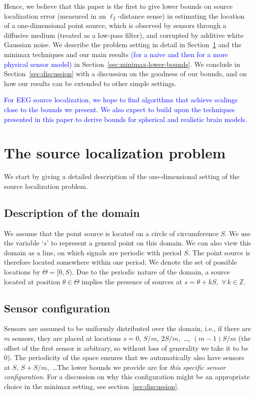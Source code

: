 \documentclass[conference]{IEEEtran}
\begin{document}
Hence, we believe that this paper is the first to give lower bounds on source
localization error (measured in an $\ell_2$-distance sense) in estimating the
location of a one-dimensional point source, which is observed by sensors
through a diffusive medium (treated as a low-pass filter), and corrupted by
additive white Gaussian noise. We describe the problem setting in detail in
Section~\ref{sec:source-localization} and the minimax techniques and our main
results \textcolor{blue}{(for a naive and then for a more physical sensor
model)} in Section~\ref{sec:minimax-lower-bounds}. We conclude in
Section~\ref{sec:discussion} with a discussion on the goodness of our bounds,
and on how our results can be extended to other simple settings.

\textcolor{blue}{
For EEG source localization, we hope to find algorithms that achieve scalings
close to the bounds we present.  We also expect to build upon the techniques
presented in this paper to derive bounds for spherical and realistic brain
models.
}

\section{The source localization problem}
\label{sec:source-localization}

We start by giving a detailed description of the one-dimensional setting of the
source localization problem.

\subsection{Description of the domain}

We assume that the point source is located on a circle of circumference $S$. We
use the variable `$s$' to represent a general point on this domain. We can also
view this domain as a line, on which signals are periodic with period $S$.  The
point source is therefore located somewhere within one period. We denote the
set of possible locations by $\Theta = [0, S)$. Due to the periodic nature of
the domain, a source located at position $\theta \in \Theta$ implies the
presence of sources at $s = \theta + kS$,~$\forall \, k \in \mathbb Z$.

\subsection{Sensor configuration}

Sensors are assumed to be uniformly distributed over the domain, i.e., if there
are $m$ sensors, they are placed at locations $s = 0$, $S/m$, $2S/m$,~\dots,
$(m{-}1)S/m$ (the offset of the first sensor is arbitrary, so without loss of
generality we take it to be 0). The periodicity of the space ensures that we
automatically also have sensors at $S$, $S{+}S/m$,~\dots\@ The lower bounds we
provide are for \emph{this specific sensor configuration}. For a discussion on
why this configuration might be an appropriate choice in the minimax setting,
see section~\ref{sec:discussion}.
\end{document}

